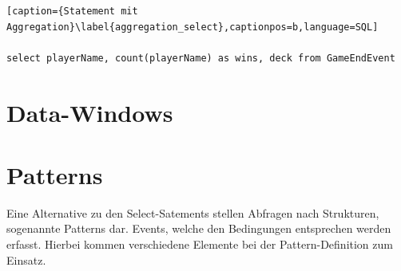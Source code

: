 \begin{lstlisting}[caption={Statement mit Aggregation}\label{aggregation_select},captionpos=b,language=SQL]

select playerName, count(playerName) as wins, deck from GameEndEvent

\end{lstlisting}

\section{Data-Windows}
\label{Data-Windows}

\section{Patterns}

Eine Alternative zu den Select-Satements stellen Abfragen nach Strukturen, sogenannte Patterns dar. Events, welche den Bedingungen entsprechen werden erfasst. Hierbei kommen verschiedene Elemente bei der Pattern-Definition zum Einsatz.

